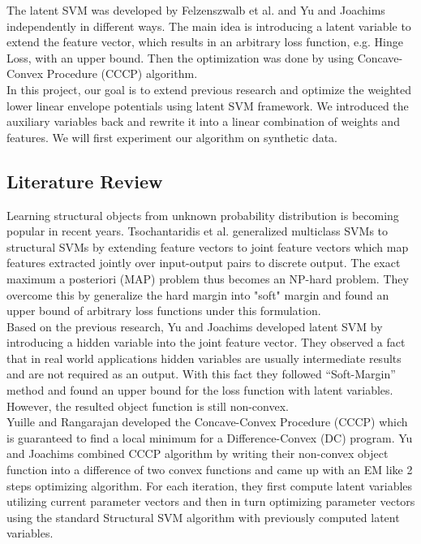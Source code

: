 \documentclass{article}
\begin{document}
	The latent SVM was developed by Felzenszwalb et al.\cite{felzenszwalb2008discriminatively} and Yu and Joachims\cite{yu2009learning} independently in different ways. The main idea is introducing a latent variable to extend the feature vector, which results in an arbitrary loss function, e.g. Hinge Loss, with an upper bound. Then the optimization was done by using Concave-Convex Procedure (CCCP) algorithm.\\
	In this project, our goal is to extend previous research\cite{gouldlearning} and optimize the weighted lower linear envelope potentials using latent SVM framework. We introduced the auxiliary variables back and rewrite it into a linear combination of weights and features. We will first experiment our algorithm on synthetic data. 

	\subsection{Literature Review}
	Learning structural objects from unknown probability distribution is becoming popular in recent years. Tsochantaridis et al.\cite{tsochantaridis2005large} generalized multiclass SVMs\cite{crammer2002algorithmic} to structural SVMs by extending feature vectors to joint feature vectors which map features extracted jointly over input-output pairs to discrete output. The exact maximum a posteriori (MAP) problem thus becomes an NP-hard problem. They overcome this by generalize the hard margin into "soft" margin and found an upper bound of arbitrary loss functions under this formulation.\\
	Based on the previous research, Yu and Joachims\cite{yu2009learning} developed latent SVM by introducing a hidden variable into the joint feature vector. They observed a fact that in real world applications hidden variables are usually intermediate results and are not required as an output. With this fact they followed “Soft-Margin” method and found an upper bound for the loss function with latent variables. However, the resulted object function is still non-convex.\\
	Yuille and Rangarajan \cite{yuille2002concave} developed the Concave-Convex Procedure (CCCP) which is guaranteed to find a local minimum for a Difference-Convex (DC) program. Yu and Joachims\cite{yu2009learning} combined CCCP algorithm by writing their non-convex object function into a difference of two convex functions and came up with an EM like 2 steps optimizing algorithm. For each iteration, they first compute latent variables utilizing current parameter vectors and then in turn optimizing parameter vectors using the standard Structural SVM algorithm with previously computed latent variables. \\
\end{document}
